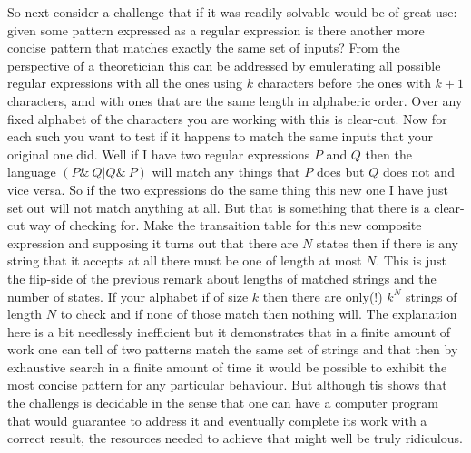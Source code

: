 So next consider a challenge that if it was readily solvable would be
of great use: given some pattern expressed as a regular expression
is there another more concise pattern that matches exactly the
same set of inputs? From the perspective of a theoretician this can
be addressed by emulerating all possible regular expressions with
all the ones using $k$ characters before the ones with $k+1$ characters,
amd with ones that are the same length in alphaberic order. Over any fixed
alphabet of the characters you are working with this is clear-cut.
Now for each such you want to test if it happens to match the same
inputs that your original one did. Well if I have two regular expressions
$P$ and $Q$ then the language $(P\&~Q | Q\&~P)$ will match any things that $P$
does but $Q$ does not and vice versa. So if the two expressions do the
same thing this new one I have just set out will not match anything at all.
But that is something that there is a clear-cut way of checking for.
Make the transaition table for this new composite expression and supposing
it turns out that there are $N$ states then if there is any string that
it accepts at all there must be one of length at most $N$. This is just
the flip-side of the previous remark about lengths of matched strings
and the number of states. If your alphabet if of size $k$ then there
are only(!) $k^{N}$ strings of length $N$ to check and if none of those
match then nothing will. The explanation here is a bit needlessly inefficient
but it demonstrates that in a finite amount of work one can tell of
two patterns match the same set of strings and that then by exhaustive search
in a finite amount of time it would be possible to exhibit the most
concise pattern for any particular behaviour. But although tis shows that the
challengs is decidable in the sense that one can have a computer program that
would guarantee to address it and eventually complete its work with a
correct result, the resources needed to achieve that might well be
truly ridiculous.

